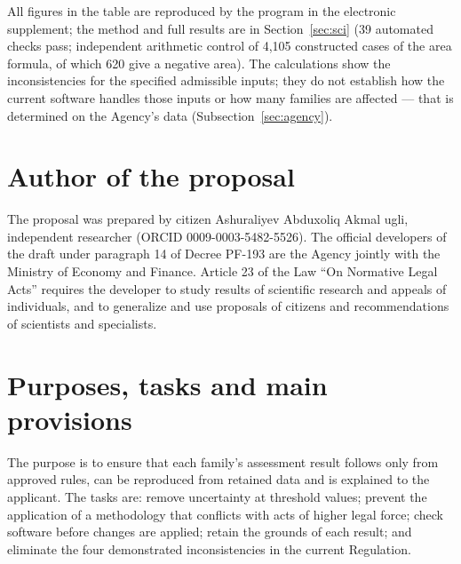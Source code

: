 \documentclass[14pt,a4paper]{extarticle}
\begin{document}
All figures in the table are reproduced by the program in the electronic supplement; the method and full results are in Section~\ref{sec:sci} (39 automated checks pass; independent arithmetic control of 4,105 constructed cases of the area formula, of which 620 give a negative area). The calculations show the inconsistencies for the specified admissible inputs; they do not establish how the current software handles those inputs or how many families are affected — that is determined on the Agency’s data (Subsection~\ref{sec:agency}).

\section{Author of the proposal}
The proposal was prepared by citizen Ashuraliyev Abduxoliq Akmal ugli, independent researcher (ORCID 0009-0003-5482-5526). The official developers of the draft under paragraph 14 of Decree PF-193 are the Agency jointly with the Ministry of Economy and Finance. Article 23 of the Law “On Normative Legal Acts” requires the developer to study results of scientific research and appeals of individuals, and to generalize and use proposals of citizens and recommendations of scientists and specialists\cite{orq682}.

\section{Purposes, tasks and main provisions}
The purpose is to ensure that each family’s assessment result follows only from approved rules, can be reproduced from retained data and is explained to the applicant. The tasks are: remove uncertainty at threshold values; prevent the application of a methodology that conflicts with acts of higher legal force; check software before changes are applied; retain the grounds of each result; and eliminate the four demonstrated inconsistencies in the current Regulation.
\end{document}
